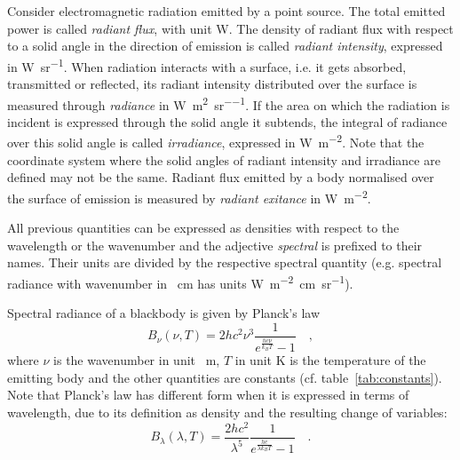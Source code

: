 \documentclass[a4paper,10pt,twocolumn,\classoptions]{article}
\begin{document}
Consider electromagnetic radiation emitted by a point source. The total emitted power is called \emph{radiant flux}, with unit \unit{\watt}. The density of radiant flux with respect to a solid angle in the direction of emission is called \emph{radiant intensity}, expressed in \unit{\watt\per\steradian}. When radiation interacts with a surface, i.e. it gets absorbed, transmitted or reflected, its radiant intensity distributed over the surface is measured through \emph{radiance} in \unit{\watt\per\square\metre\per\steradian}. If the area on which the radiation is incident is expressed through the solid angle it subtends, the integral of radiance over this solid angle is called \emph{irradiance}, expressed in \unit{\watt\per\square\metre}. Note that the coordinate system where the solid angles of radiant intensity and irradiance are defined may not be the same. Radiant flux emitted by a body normalised over the surface of emission is measured by \emph{radiant exitance} in \unit{\watt\per\square\metre}.

All previous quantities can be expressed as densities with respect to the wavelength or the wavenumber and the adjective \emph{spectral} is prefixed to their names. Their units are divided by the respective spectral quantity (e.g. spectral radiance with wavenumber in \unit{\per\centi\metre} has units \unit{\watt\per\metre\squared\centi\metre\per\steradian}).

Spectral radiance of a blackbody is given by Planck's law
\begin{equation}
  \label{eq:spectral_radiance_blackbody}
  B_\nu (\nu, T) = 2 h c^2 \nu^3 \frac{1}{e^\frac{h c \nu}{k_B T} - 1}
  \quad ,
\end{equation}
where $\nu$ is the wavenumber in unit \unit{\per\metre}, $T$ in unit \unit{\kelvin} is the temperature of the emitting body and the other quantities are constants (cf. table~\ref{tab:constants}).
Note that Planck's law has different form when it is expressed in terms of wavelength, due to its definition as density and the resulting change of variables:
\begin{equation}
  \label{eq:spectral_radiance_blackbody_lambda}
  B_\lambda (\lambda, T) = \frac{2 h c^2}{\lambda^5} \frac{1}{e^\frac{h c}{\lambda k_B T} - 1}
  \quad .
\end{equation}
\end{document}
